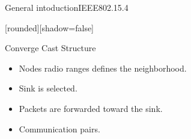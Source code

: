 \begin{withoutheadline}
\begin{frame}{General intoduction}{IEEE802.15.4}

[rounded][shadow=false]


\begin{minipage}[t]{0.48\linewidth}

\begin{block}{Converge Cast Structure}
    \begin{itemize}
    \item Nodes radio ranges defines the neighborhood.
    \item<2-> \alert{Sink} is selected. 
    \item<3-> Packets are forwarded \alert{toward the sink}.
    \item<4-> Communication pairs.
    \end{itemize}
    \end{block}
\end{minipage}\hfill
\begin{minipage}[t]{0.48\linewidth}
\centering
 \begin{figure}[p]


\end{figure}
\end{minipage}
\end{frame}
\end{withoutheadline}
